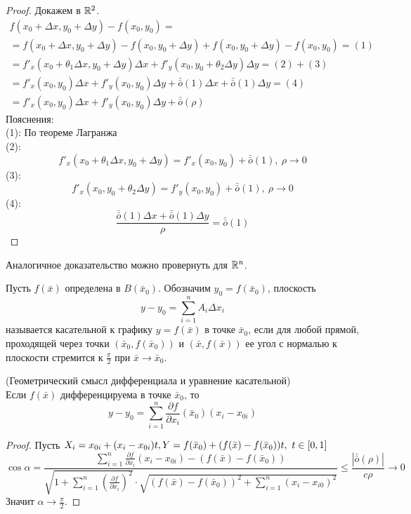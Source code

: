 \begin{proof}
    Докажем в $\mathbb{R}^2$.
    \begin{multline*}
        f(x_0+\Delta x, y_0+\Delta y)-f(x_0, y_0)=\\
        =f(x_0+\Delta x, y_0+\Delta y)-f(x_0, y_0+\Delta y)+f(x_0, y_0+\Delta y)-f(x_0, y_0)= (1)\\
        =f'_x(x_0+\theta_1 \Delta x, y_0+\Delta y)\Delta x+f'_y(x_0,y_0+\theta_2 \Delta y) \Delta y= (2)+(3)\\
        =f'_x(x_0,y_0)\Delta x+f'_y(x_0,y_0)\Delta y+\bar{\bar{o}}{(1)}\Delta x+\bar{\bar{o}}{(1)} \Delta y= (4)\\
        =f'_x(x_0,y_0)\Delta x+f'_y(x_0,y_0)\Delta y+\bar{\bar{o}}{(\rho)}
    \end{multline*}
    Пояснения:\\
    (1): По теореме Лагранжа\\
    (2):
    \[f'_x(x_0+\theta_1 \Delta x, y_0+\Delta y)=f'_x(x_0,y_0)+\bar{\bar{o}}{(1)},\ \rho \to 0\]
    (3):
    \[f'_x(x_0, y_0+\theta_2 \Delta y)=f'_y(x_0,y_0)+\bar{\bar{o}}{(1)},\ \rho \to 0\]
    (4): \[\frac{\bar{\bar{o}}{(1)}\Delta x+\bar{\bar{o}}{(1)} \Delta y}{\rho}=\bar{\bar{o}}{(1)}\]
\end{proof} 
\begin{comm}
    Аналогичное доказательство можно провернуть для $\mathbb{R}^n$.
\end{comm}
\begin{definition}
    Пусть $f(\bar{x})$ определена в $B(\bar{x}_0)$. Обозначим $y_0=f(\bar{x}_0)$, плоскость
    \[y-y_0=\sum\limits_{i=1}^{n}A_i \Delta x_i\]
    называется касательной к графику $y=f(\bar{x})$ в точке $\bar{x}_0$, если для любой прямой, проходящей через точки $(\bar{x}_0, f(\bar{x}_0))$ и $(\bar{x}, f(\bar{x}))$ ее угол с нормалью к плоскости стремится к $\frac{\pi}{2}$ при $\bar{x}\to \bar{x}_0$.
\end{definition} 
\begin{theorem} (Геометрический смысл дифференциала и уравнение касательной)\\
    Если $f(\bar{x})$ дифференцируема в точке $\bar{x}_0$, то 
    \[y-y_0=\sum\limits_{i=1}^{n}\frac{\partial {f}}{\partial {x_i}}(\bar{x}_0)(x_i-x_{0i})\]
\end{theorem} 
\begin{proof}
    Пусть $X_i=x_{0i}+(x_i-x_{0i})t,\\ Y=f(\bar{x}_0)+(f(\bar{x})-f(\bar{x}_0))t,\ t\in [0,1]$
    \[\cos{\alpha}=\frac{\sum\limits_{i=1}^{n}\frac{\partial {f}}{\partial {x_i}}(x_i-x_{0i})-(f(\bar{x})-f(\bar{x}_0))}{\sqrt{1+\sum\limits_{i=1}^{n}(\frac{\partial {f}}{\partial {x_i}})^2}\cdot \sqrt{(f(\bar{x})-f(\bar{x}_0))^2+\sum\limits_{i=1}^{n}(x_i-x_{i0})^2}}\leq \frac{|\bar{\bar{o}}{(\rho)}|}{c\rho}\to 0\]
    Значит $\alpha \to \frac{\pi}{2}$.
\end{proof} 
